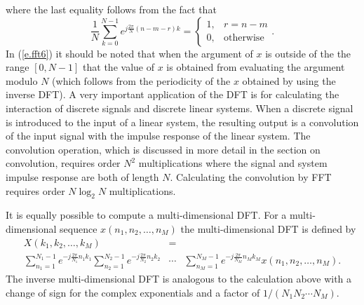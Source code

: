 %
where the last equality follows from the fact that
%
\begin{equation}
\frac{1}{N}\sum_{k=0}^{N-1}e^{j\frac{2\pi}{N}(n-m-r)k}=\left\{
   \begin{array}{cc}
                1,&r=n-m\\
                0,&\mbox{otherwise}\end{array}\right..
\label{e.fft7}
\end{equation}
%
In (\ref{e.fft6}) it should be noted that when the argument of
$x$ is outside of the the range $[0,N-1]$ that the value of $x$
is obtained from evaluating the argument modulo $N$ (which follows
from the periodicity of the $x$ obtained by using the inverse DFT).
	A very important application of the DFT
is for calculating the interaction of discrete
signals and discrete linear systems.  When a
discrete signal is introduced to the input of a
linear system, the resulting output is a convolution
of the input signal with the impulse response of
the linear system.  The convolution operation, which
is discussed in more detail in the section
on convolution, requires order $N^2$ multiplications where
the signal and system impulse response are both of length $N$.
Calculating the convolution by FFT requires order
$N\log_2N$ multiplications.

	It is equally possible to compute a multi-dimensional DFT.
For a multi-dimensional sequence $x(n_1,n_2,\ldots,n_M)$ the multi-dimensional
DFT is defined by
%
\begin{eqnarray}
X(k_1,k_2,\ldots,k_M)&=&\nonumber\\
\sum_{n_1=1}^{N_1-1}e^{-j\frac{2\pi}{N_1}n_1k_1}\sum_{n_2=1}^{N_2-1}e^{-j\frac{2\pi}{N_2}n_2k_2}&\cdots&\sum_{n_M=1}^{N_M-1}e^{-j\frac{2\pi}{N_M}n_Mk_M}x(n_1,n_2,\ldots,n_M).
\end{eqnarray}
%
The inverse multi-dimensional DFT is analogous to the calculation above
 with a change of sign for the complex exponentials
and a factor of $1/(N_1N_2\cdots N_M)$.

